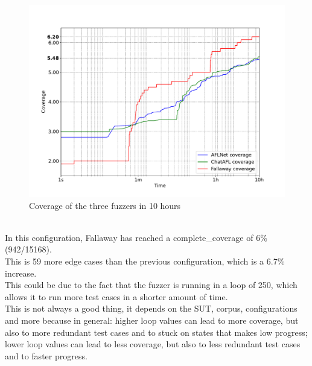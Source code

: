\begin{figure}[H]
    \centering
    \includegraphics[width=1\textwidth]{Images/coverage_over_time_lighttpd-10h.pdf}
    \caption{Coverage of the three fuzzers in 10 hours}
    \label{fig:coverage_10hours}
\end{figure}
\phantom{}\\
In this configuration, Fallaway has reached a complete\_coverage of 6\% (942/15168).
\\This is 59 more edge cases than the previous configuration, which is a 6.7\% increase.
\\This could be due to the fact that the fuzzer is running in a loop of 250, which allows it to run more test cases in a shorter amount of time.
\\This is not always a good thing, it depends on the SUT, corpus, configurations and more because in general: higher loop values can lead to more coverage, but also to more redundant test cases and to stuck on states that makes low progress; lower loop values can lead to less coverage, but also to less redundant test cases and to faster progress.